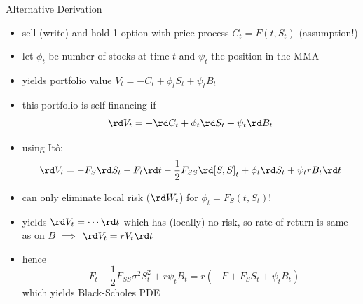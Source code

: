 \documentclass[pdf, handout]{beamer}
\begin{document}
\begin{frame}{Alternative Derivation}
\begin{itemize}
\item sell (write) and hold 1 option with price process
$C_t = F(t, S_t)$  (assumption!)
\item let $\phi_t$ be number of stocks at time $t$ and $\psi_t$ the position in the MMA 
\item yields portfolio value $V_t =  - C_t + \phi_t S_t + \psi_t B_t$
\item this portfolio is self-financing if
\[
\rd V_t =  - \rd C_t  + \phi_t \rd S_t + \psi_t \rd B_t
\]
\item 
using It\^o:
\[
\rd V_t = - F_S \rd S_t - F_t \rd t - \frac{1}{2}F_{SS} \rd [S,S]_t + \phi_t \rd S_t
+ \psi_t r B_t \rd t
\]
\item can only eliminate local risk ($\rd W_t$) for $\phi_t = F_S(t, S_t)$!
\item yields $\rd V_t = \cdots \rd t$  which has (locally) no risk, so
rate of return is same as on $B$ $\implies$ $\rd V_t =r V_t \rd t$
\item hence 
\[
-F_t - \frac{1}{2}F_{SS}\sigma^2 S_t^2 + r\psi_t B_t = r \left(  - F  + F_S S_t + \psi_t B_t
\right)
\]
which yields Black-Scholes PDE
\end{itemize}

\end{frame}
\end{document}
